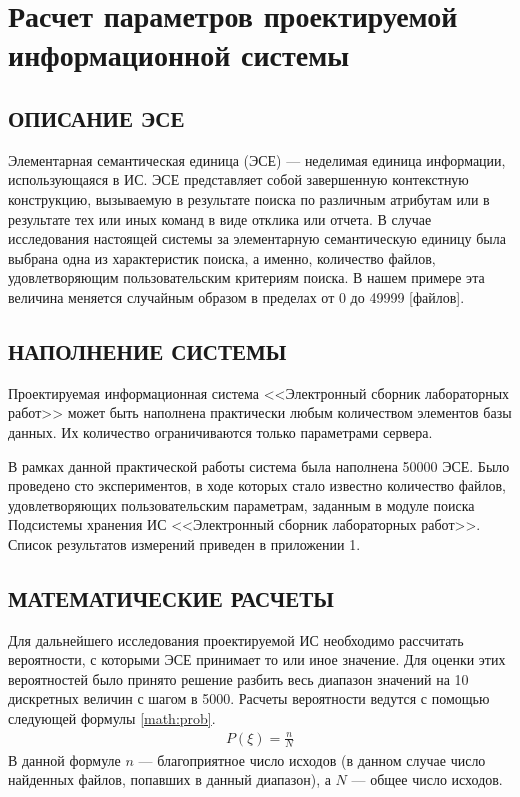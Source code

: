 \documentclass[a4paper,14pt]{extarticle}
\begin{document}
%
%
\clearpage
\section{Расчет параметров проектируемой информационной	системы}

\subsection{ОПИСАНИЕ ЭСЕ}

Элементарная семантическая единица (ЭСЕ) --- неделимая единица
информации, использующаяся в ИС. ЭСЕ представляет собой завершенную
контекстную конструкцию, вызываемую в результате поиска по различным
атрибутам или в результате тех или иных команд в виде отклика или отчета. В случае исследования настоящей системы за элементарную семантическую единицу была выбрана одна из характеристик поиска, а именно, количество файлов, удовлетворяющим пользовательским критериям поиска. В нашем примере эта величина меняется случайным
образом в пределах от 0 до 49999 [файлов].


\subsection{НАПОЛНЕНИЕ СИСТЕМЫ}

Проектируемая информационная система <<Электронный сборник лабораторных работ>> может быть наполнена
практически любым количеством элементов базы данных. Их количество
ограничиваются только параметрами сервера.

В рамках данной практической работы система была наполнена 50000 ЭСЕ. Было проведено сто экспериментов, в ходе которых стало известно количество файлов, удовлетворяющих пользовательским параметрам, заданным в модуле поиска Подсистемы хранения ИС <<Электронный сборник лабораторных работ>>. Список результатов измерений приведен в приложении 1.


\subsection{МАТЕМАТИЧЕСКИЕ РАСЧЕТЫ}
Для дальнейшего исследования проектируемой ИС необходимо
рассчитать вероятности, с которыми ЭСЕ принимает то или иное значение.
Для оценки этих вероятностей было принято решение разбить весь диапазон
значений на 10 дискретных величин с шагом в 5000. Расчеты вероятности ведутся с
помощью следующей формулы  \ref{math:prob}.
\begin{align}
P(\xi)=\frac{n}N \label{math:prob}
\end{align}
В данной формуле $n$ --- благоприятное число исходов (в данном
случае число найденных файлов, попавших в данный диапазон), а $N$ --- общее число исходов. 
\end{document}
